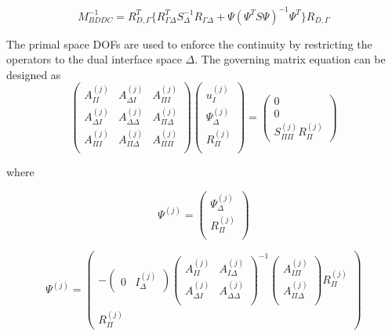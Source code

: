 \begin{equation}
 M_{BDDC}^{-1} = R_{D, \Gamma}^{T} \{ R_{\Gamma \Delta}^{T} S^{-1}_{\Delta} R_{\Gamma \Delta} + \Psi (\Psi^{T} S \Psi)^{-1} \Psi^{T} \} R_{D, \Gamma}
 \end{equation}
 
 The primal space DOFs are used to enforce the continuity by restricting the operators to the dual interface space $ \Delta $. The governing matrix equation can be designed as
 \begin{equation}
 \begin{pmatrix}
 A_{II}^{(j)} & A_{\Delta I}^{(j)} & A^{(j)}_{\Pi I} \\
 A_{\Delta I}^{(j)} & A_{\Delta \Delta}^{(j)} & A_{\Pi \Delta}^{(j)} \\
 A_{\Pi I}^{(j)} & A_{\Pi \Delta}^{(j)} & A_{\Pi \Pi}^{(j)} \\
 \end{pmatrix} \begin{pmatrix}
 u_{I}^{(j)} \\ \Psi_{\Delta}^{(j)} \\ R_{\Pi}^{(j)} \\
 \end{pmatrix} = \begin{pmatrix}
 0 \\ 0 \\ S_{\Pi \Pi}^{(j)} R_{\Pi}^{(j)}
 \end{pmatrix}
 \end{equation}
 
 where
 
 \begin{equation}
 \Psi^{(j)} = \begin{pmatrix}
 \Psi_{\Delta}^{(j)} \\ R_{\Pi}^{(j)} \\
 \end{pmatrix}
 \end{equation}
 
 \begin{equation}
 \Psi^{(j)} = \begin{pmatrix}
 -\begin{pmatrix}
 0 & I_{\Delta}^{(j)} 
 \end{pmatrix} \begin{pmatrix}
 A_{II}^{(j)} & A_{I \Delta}^{(j)} \\
 A_{\Delta I}^{(j)} & A_{\Delta \Delta}^{(j)} \\
 \end{pmatrix}^{-1} \begin{pmatrix}
 A_{I \Pi}^{(j)} \\ A_{\Pi \Delta}^{(j)} \\
 \end{pmatrix} R_{\Pi}^{(j)} \\
 R_{\Pi}^{(j)}
 \end{pmatrix}
 \end{equation}
 
